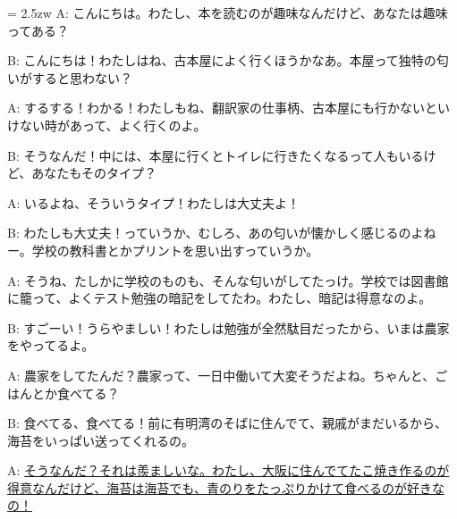 \documentclass[11pt]{amsart}
\title{}
\author{}
\newenvironment{hangall}[1]{\hangindent = 2.5zw\everypar{\hangindent = 2.5zw}}{}
\begin{document}
\maketitle
\begin{hangall}{}%
A: こんにちは。わたし、本を読むのが趣味なんだけど、あなたは趣味ってある？

B: こんにちは！わたしはね、古本屋によく行くほうかなあ。本屋って独特の匂いがすると思わない？

A: するする！わかる！わたしもね、翻訳家の仕事柄、古本屋にも行かないといけない時があって、よく行くのよ。

B: そうなんだ！中には、本屋に行くとトイレに行きたくなるって人もいるけど、あなたもそのタイプ？

A: いるよね、そういうタイプ！わたしは大丈夫よ！

B: わたしも大丈夫！っていうか、むしろ、あの匂いが懐かしく感じるのよねー。学校の教科書とかプリントを思い出すっていうか。

A: そうね、たしかに学校のものも、そんな匂いがしてたっけ。学校では図書館に籠って、よくテスト勉強の暗記をしてたわ。わたし、暗記は得意なのよ。

B: すごーい！うらやましい！わたしは勉強が全然駄目だったから、いまは農家をやってるよ。

A: 農家をしてたんだ？農家って、一日中働いて大変そうだよね。ちゃんと、ごはんとか食べてる？

B: 食べてる、食べてる！前に有明湾のそばに住んでて、親戚がまだいるから、海苔をいっぱい送ってくれるの。

A: \ul{そうなんだ？それは羨ましいな。わたし、大阪に住んでてたこ焼き作るのが得意なんだけど、海苔は海苔でも、青のりをたっぷりかけて食べるのが好きなの！}\end{hangall}
\end{document}
